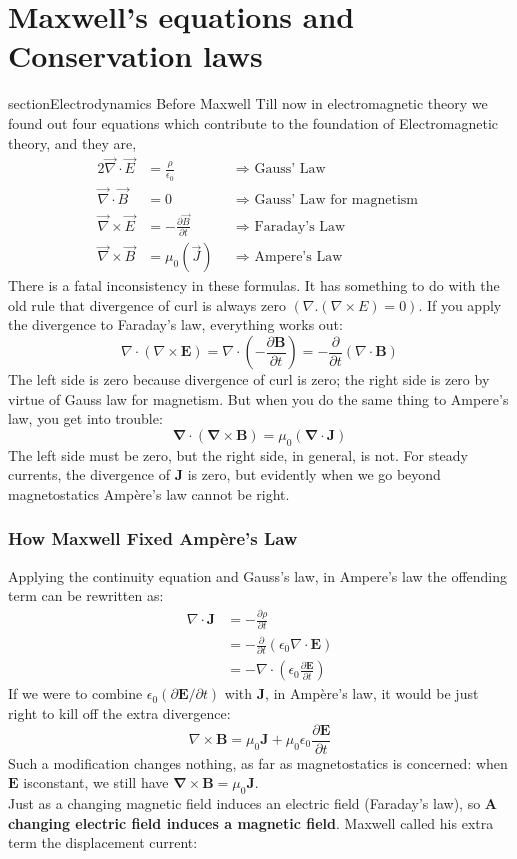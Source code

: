 \chapter{Maxwell's equations and Conservation laws}
section{Electrodynamics Before Maxwell}
Till now in electromagnetic theory we found out four equations which contribute to the foundation of Electromagnetic theory, and they are,
\begin{align*}{2}
\vec{\nabla} \cdot \vec{E}&=\frac{\rho}{\epsilon_{0}} \quad && \Rightarrow \text { Gauss' Law }  \\
\vec{\nabla} \cdot \vec{B}&=0 \quad && \Rightarrow \text { Gauss' Law for magnetism } \\
\vec{\nabla} \times \vec{E}&=-\frac{\partial \vec{B}}{\partial t} && \Rightarrow \text { Faraday's Law } \\
\vec{\nabla} \times \vec{B}&=\mu_{0}\left(\vec{J}\right) && \Rightarrow \text { Ampere's Law }
\end{align*}
There is a fatal inconsistency in these formulas. It has something to do with the old rule that divergence of curl is always zero $ (\nabla .(\nabla \times E)=0)$. If you apply the divergence to Faraday's law, everything works out: 
$$\nabla \cdot(\nabla \times \mathbf{E})=\nabla \cdot\left(-\frac{\partial \mathbf{B}}{\partial t}\right)=-\frac{\partial}{\partial t}(\nabla \cdot \mathbf{B})$$
The left side is zero because divergence of curl is zero; the right side is zero by virtue of Gauss law for magnetism. But when you do the same thing to Ampere's law, you get into trouble:$$\boldsymbol{\nabla} \cdot(\boldsymbol{\nabla} \times \mathbf{B})=\mu_{0}(\boldsymbol{\nabla} \cdot \mathbf{J})$$ The left side must be zero, but the right side, in general, is not. For steady currents, the divergence of $\mathbf{J}$ is zero, but evidently when we go beyond magnetostatics Ampère's law cannot be right.
\subsection{How Maxwell Fixed Ampère's Law}
Applying the continuity equation  and Gauss's law, in  Ampere's law the offending term can be rewritten as:
\begin{align*}
\nabla \cdot \mathbf{J}&=-\frac{\partial \rho}{\partial t}\\
&=-\frac{\partial}{\partial t}\left(\epsilon_{0} \nabla \cdot \mathbf{E}\right)\\&=-\nabla \cdot\left(\epsilon_{0} \frac{\partial \mathbf{E}}{\partial t}\right)
\end{align*}
If we were to combine $\epsilon_{0}(\partial \mathbf{E} / \partial t)$ with $\mathbf{J}$, in Ampère's law, it would be just right to kill off the extra divergence:$$\nabla \times \mathbf{B}=\mu_{0} \mathbf{J}+\mu_{0} \epsilon_{0} \frac{\partial \mathbf{E}}{\partial t}$$ Such a modification changes nothing, as far as magnetostatics is concerned: when $\mathbf{E}$ isconstant, we still have $\boldsymbol{\nabla} \times \mathbf{B}=\mu_{0} \mathbf{J}$.\\
Just as a changing magnetic field induces an electric field (Faraday's law), so \textbf{A changing electric field induces a magnetic field}.  Maxwell called his extra term the displacement current:

